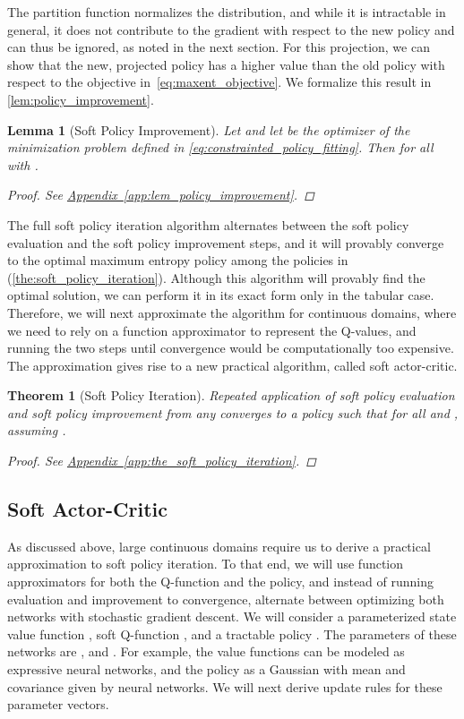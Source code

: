 \documentclass{article}
\newtheorem{theorem}{Theorem}
\newtheorem{lemma}{Lemma}
\newcommand{\aref}[1]{\hyperref[#1]{Appendix~\ref*{#1}}}
\begin{document}
The partition function  normalizes the distribution, and while it is intractable in general, it does not contribute to the gradient with respect to the new policy and can thus be ignored, as noted in the next section. For this projection, we can show that the new, projected policy has a higher value than the old policy with respect to the objective in~\autoref{eq:maxent_objective}. We formalize this result in \autoref{lem:policy_improvement}.
\begin{lemma}[Soft Policy Improvement]
\label{lem:policy_improvement}
Let  and let  be the optimizer of the minimization problem defined in \autoref{eq:constrainted_policy_fitting}. Then  for all  with .
\begin{proof}
See \aref{app:lem_policy_improvement}.
\end{proof}
\end{lemma}
The full soft policy iteration algorithm alternates between the soft policy evaluation and the soft policy improvement steps, and it will provably converge to the optimal maximum entropy policy among the policies in  (\autoref{the:soft_policy_iteration}). Although this algorithm will provably find the optimal solution, we can perform it in its exact form only in the tabular case. Therefore, we will next approximate the algorithm for continuous domains, where we need to rely on a function approximator to represent the Q-values, and running the two steps until convergence would be computationally too expensive. The approximation gives rise to a new practical algorithm, called soft actor-critic.
\begin{theorem}[Soft Policy Iteration]
\label{the:soft_policy_iteration}
Repeated application of soft policy evaluation and soft policy improvement from any  converges to a policy  such that  for all  and , assuming .
\begin{proof}
See \aref{app:the_soft_policy_iteration}.
\end{proof}
\end{theorem}


\subsection{Soft Actor-Critic}

As discussed above, large continuous domains require us to derive a practical approximation to soft policy iteration. To that end, we will use function approximators for both the Q-function and the policy, and instead of running evaluation and improvement to convergence, alternate between optimizing both networks with stochastic gradient descent.
We will consider a parameterized state value function , soft Q-function , and a tractable policy . The parameters of these networks are , and .
For example, the value functions can be modeled as expressive neural networks, and the policy as a Gaussian with mean and covariance given by neural networks. We will next derive update rules for these parameter vectors.
\end{document}
